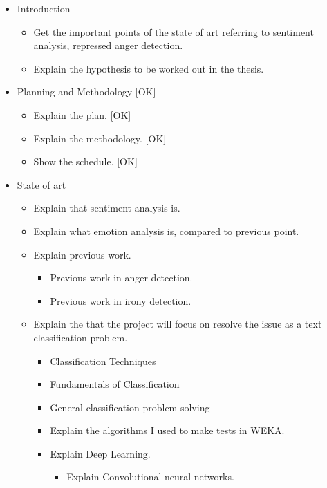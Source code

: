 \begin{itemize}
  \item Introduction
  \begin{itemize}
    \item Get the important points of the state of art referring to sentiment analysis, repressed anger detection.
    \item Explain the hypothesis to be worked out in the thesis.
  \end{itemize}

  \item Planning and Methodology [OK]
  \begin{itemize}
    \item Explain the plan. [OK]
    \item Explain the methodology. [OK]
    \item Show the schedule. [OK]
  \end{itemize}

  \item State of art
  \begin{itemize}
    \item Explain that sentiment analysis is.
    \item Explain what emotion analysis is, compared to previous point.
    \item Explain previous work.
    \begin{itemize}
      \item Previous work in anger detection.
      \item Previous work in irony detection.
    \end{itemize}
    \item Explain the that the project will focus on resolve the issue as a text classification problem.
    \begin{itemize}
      \item Classification Techniques 
      \item Fundamentals of Classification 
      \item General classification problem solving
      \item Explain the algorithms I used to make tests in WEKA.
      \item Explain Deep Learning.
      \begin{itemize}
        \item Explain Convolutional neural networks.
      \end{itemize}
    \end{itemize}
  \end{itemize} 


\end{itemize}
